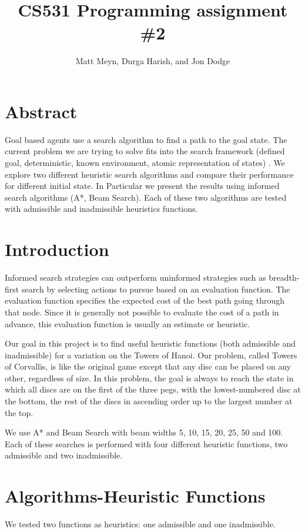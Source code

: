 \documentclass{article}
\title{CS531 Programming assignment \#2}
\author{Matt Meyn, Durga Harish, and Jon Dodge}
\begin{document}
\maketitle
\section{Abstract}

Goal based agents use a search algorithm to find a path to the goal state.  The current problem we are trying to solve fits into the search framework (defined goal, deterministic, known environment, atomic representation of states) .   We explore two different heuristic search algorithms and compare their performance for different initial state. In Particular we present the results using informed search algorithms (A*, Beam Search).  Each of these two algorithms are tested with admissible and inadmissible heuristics functions.

\section{Introduction}

Informed search strategies can outperform uninformed strategies such as breadth-first search by selecting actions to pursue based on an evaluation function. The evaluation function specifies the expected cost of the best path going through that node. Since it is generally not possible to evaluate the cost of a path in advance, this evaluation function is usually an estimate or heuristic.

Our goal in this project is to find useful heuristic functions (both admissible and inadmissible) for a variation on the Towers of Hanoi. Our problem, called Towers of Corvallis, is like the original game except that any disc can be placed on any other, regardless of size. In this problem, the goal is always to reach the state in which all discs are on the first of the three pegs, with the lowest-numbered disc at the bottom, the rest of the discs in ascending order up to the largest number at the top.

We use A* and Beam Search with beam widths 5, 10, 15, 20, 25, 50 and 100. Each of these searches is performed with four different heuristic functions, two admissible and two inadmissible.


\section{Algorithms-Heuristic Functions}
We tested two functions as heuristics: one admissible and one inadmissible.\\
\end{document}
